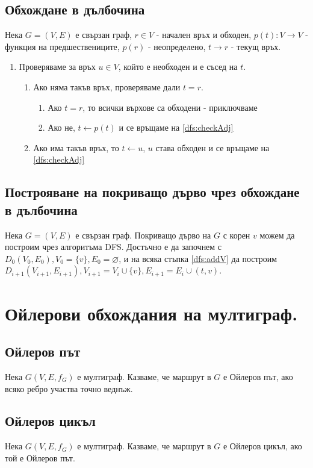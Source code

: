 \documentclass[fleqn,12pt]{article}
\begin{document}
\begin{flushleft}
\subsection{Обхождане в дълбочина} 
Нека $G = (V, E)$ е свързан граф, $r \in V$ - начален връх и обходен, 
$p(t) : V \rightarrow V$ - функция на предшествениците, $p(r)$ - неопределено, $t \rightarrow r$ - текущ връх.
\begin{enumerate}
	\item \label{dfs:checkAdj} Проверяваме за връх $u \in V$, който е необходен и е съсед на $t$.
	\begin{enumerate}
		\item Ако няма такъв връх, проверяваме дали $t = r$.
		\begin{enumerate}
			\item Ако $t = r$, то всички върхове са обходени - приключваме
			\item Ако не, $t \leftarrow p(t)$ и се връщаме на \ref{dfs:checkAdj}
		\end{enumerate}
		\item \label{dfs:addV} Ако има такъв връх, то $t \leftarrow u$, $u$ става обходен и се връщаме на \ref{dfs:checkAdj}
	\end{enumerate}
\end{enumerate} 

\subsection{Построяване на покриващо дърво чрез обхождане в дълбочина} 
Нека $G = (V, E)$ е свързан граф.
Покриващо дърво на $G$ с корен $v$ можем да построим чрез алгоритъма DFS. Достъчно е да започнем
с $D_0(V_0, E_0), V_0 = \{v\}, E_0 = \varnothing$, и на всяка стъпка \ref{dfs:addV} да построим
$D_{i + 1}(V_{i + 1}, E_{i + 1}), V_{i + 1} = V_i \cup \{ v \}, E_{i + 1} = E_i \cup (t, v)$.

\section{Ойлерови обхождания на мултиграф.}

\subsection{Ойлеров път} 
Нека $G(V,E,f_G)$ е мултиграф. Казваме, че маршрут в $G$ е Ойлеров път, ако всяко ребро
участва точно веднъж.

\subsection{Ойлеров цикъл} 
Нека $G(V,E,f_G)$ е мултиграф. Казваме, че маршрут в $G$ е Ойлеров цикъл, ако той е Ойлеров път.


\end{flushleft}
\end{document}

